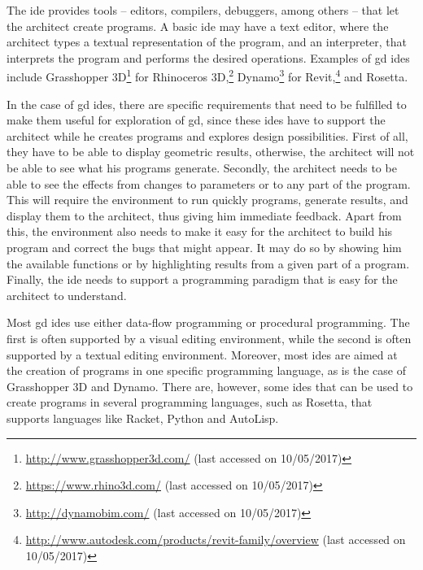 The \gls{ide} provides tools -- editors, compilers, debuggers, among others -- that let the architect create programs.
A basic \gls{ide} may have a text editor, where the architect types a textual representation of the program, and an interpreter, that interprets the program and performs the desired operations.
Examples of \gls{gd} \glspl{ide} include Grasshopper 3D\footnote{\url{http://www.grasshopper3d.com/} (last accessed on 10/05/2017)} for Rhinoceros 3D,\footnote{\url{https://www.rhino3d.com/} (last accessed on 10/05/2017)} Dynamo\footnote{\url{http://dynamobim.com/} (last accessed on 10/05/2017)} for Revit,\footnote{\url{http://www.autodesk.com/products/revit-family/overview} (last accessed on 10/05/2017)} and Rosetta\cite{de2012modern}.

In the case of \gls{gd} \glspl{ide}, there are specific requirements that need to be fulfilled to make them useful for exploration of \gls{gd}, since these \glspl{ide} have to support the architect while he creates programs and explores design possibilities.
First of all, they have to be able to display geometric results, otherwise, the architect will not be able to see what his programs generate.
Secondly, the architect needs to be able to see the effects from changes to parameters or to any part of the program.
This will require the environment to run quickly programs, generate results, and display them to the architect, thus giving him immediate feedback.
Apart from this, the environment also needs to make it easy for the architect to build his program and correct the bugs that might appear.
It may do so by showing him the available functions or by highlighting results from a given part of a program.
Finally, the \gls{ide} needs to support a programming paradigm that is easy for the architect to understand.

Most \gls{gd} \glspl{ide} use either data-flow programming or procedural programming.
The first is often supported by a visual editing environment, while the second is often supported by a textual editing environment.
Moreover, most \glspl{ide} are aimed at the creation of programs in one specific programming language, as is the case of Grasshopper 3D and Dynamo.
There are, however, some \glspl{ide} that can be used to create programs in several programming languages, such as Rosetta, that supports languages like Racket\cite{flatt2016racket}, Python\cite{rossum2003python} and AutoLisp.

